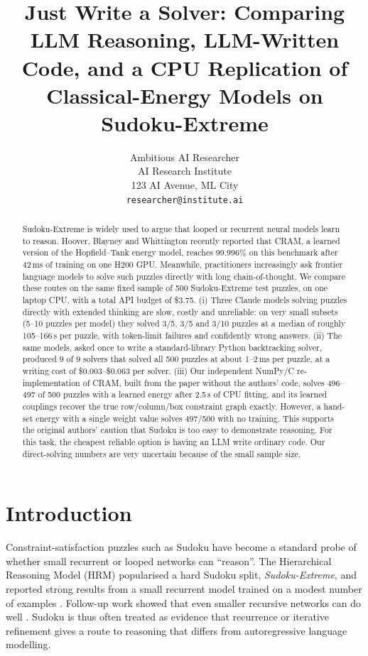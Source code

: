 \documentclass{article} %
\title{Just Write a Solver: Comparing LLM Reasoning, LLM-Written Code, and a CPU Replication of Classical-Energy Models on Sudoku-Extreme}
\author{Ambitious AI Researcher\\
AI Research Institute\\
123 AI Avenue, ML City\\
\texttt{researcher@institute.ai}
}
\begin{document}
\maketitle

\begin{abstract}
Sudoku-Extreme is widely used to argue that looped or recurrent neural models learn to reason. Hoover, Blayney and Whittington recently reported that CRAM, a learned version of the Hopfield--Tank energy model, reaches 99.996\% on this benchmark after 42\,ms of training on one H200 GPU. Meanwhile, practitioners increasingly ask frontier language models to solve such puzzles directly with long chain-of-thought. We compare these routes on the same fixed sample of 500 Sudoku-Extreme test puzzles, on one laptop CPU, with a total API budget of \$3.75. (i) Three Claude models solving puzzles directly with extended thinking are slow, costly and unreliable: on very small subsets (5--10 puzzles per model) they solved 3/5, 3/5 and 3/10 puzzles at a median of roughly 105--166\,s per puzzle, with token-limit failures and confidently wrong answers. (ii) The same models, asked once to write a standard-library Python backtracking solver, produced 9 of 9 solvers that solved all 500 puzzles at about 1--2\,ms per puzzle, at a writing cost of \$0.003--\$0.063 per solver. (iii) Our independent NumPy/C re-implementation of CRAM, built from the paper without the authors' code, solves 496--497 of 500 puzzles with a learned energy after 2.5\,s of CPU fitting, and its learned couplings recover the true row/column/box constraint graph exactly. However, a hand-set energy with a single weight value solves 497/500 with no training. This supports the original authors' caution that Sudoku is too easy to demonstrate reasoning. For this task, the cheapest reliable option is having an LLM write ordinary code. Our direct-solving numbers are very uncertain because of the small sample size.
\end{abstract}

\section{Introduction}
\label{sec:intro}
Constraint-satisfaction puzzles such as Sudoku have become a standard probe of whether small recurrent or looped networks can ``reason''. The Hierarchical Reasoning Model (HRM) popularised a hard Sudoku split, \emph{Sudoku-Extreme}, and reported strong results from a small recurrent model trained on a modest number of examples \citep{wang2025hrm}. Follow-up work showed that even smaller recursive networks can do well \citep{jolicoeur2025trm}. Sudoku is thus often treated as evidence that recurrence or iterative refinement gives a route to reasoning that differs from autoregressive language modelling.
\end{document}
